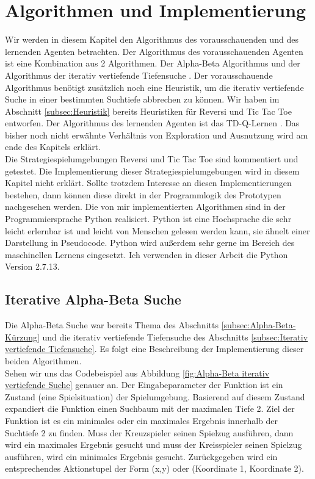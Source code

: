 \chapter{Algorithmen und Implementierung}
\label{cha:Algorithmen und Implementierung}

Wir werden in diesem Kapitel den Algorithmus des vorausschauenden und des lernenden Agenten betrachten. Der Algorithmus des vorausschauenden Agenten ist eine Kombination aus 2 Algorithmen. Der Alpha-Beta Algorithmus \cite[212 \psqq]{Russell} und der Algorithmus der iterativ vertiefende Tiefensuche \cite[124 \psqq]{Russell}. Der vorausschauende Algorithmus benötigt zusätzlich noch eine Heuristik, um die iterativ vertiefende Suche in einer bestimmten Suchtiefe abbrechen zu können. Wir haben im Abschnitt \ref{subsec:Heuristik} bereits Heuristiken für Reversi und Tic Tac Toe entworfen. Der Algorithmus des lernenden Agenten ist das TD-Q-Lernen \cite[973 \psqq]{Russell}. Das bisher noch nicht erwähnte Verhältnis von Exploration und Ausnutzung wird am ende des Kapitels erklärt.\\

Die Strategiespielumgebungen Reversi und Tic Tac Toe sind kommentiert und getestet. Die Implementierung dieser Strategiespielumgebungen wird in diesem Kapitel nicht erklärt. Sollte trotzdem Interesse an diesen Implementierungen bestehen, dann können diese direkt in der Programmlogik des Prototypen nachgesehen werden. Die von mir implementierten Algorithmen sind in der Programmiersprache Python realisiert. Python ist eine Hochsprache die sehr leicht erlernbar ist und leicht von Menschen gelesen werden kann, sie ähnelt einer Darstellung in Pseudocode. Python wird außerdem sehr gerne im Bereich des maschinellen Lernens eingesetzt. Ich verwenden in dieser Arbeit die Python Version 2.7.13. \\

\section{Iterative Alpha-Beta Suche}
Die Alpha-Beta Suche war bereits Thema des Abschnitts \ref{subsec:Alpha-Beta-Kürzung} und die iterativ vertiefende Tiefensuche des Abschnitts \ref{subsec:Iterativ vertiefende Tiefensuche}. Es folgt eine Beschreibung der Implementierung dieser beiden Algorithmen.\\

Sehen wir uns das Codebeispiel aus Abbildung \ref{fig:Alpha-Beta iterativ vertiefende Suche} genauer an. Der Eingabeparameter der Funktion ist ein Zustand (eine Spielsituation) der Spielumgebung. Basierend auf diesem Zustand expandiert die Funktion einen Suchbaum mit der maximalen Tiefe 2. Ziel der Funktion ist es ein minimales oder ein maximales Ergebnis innerhalb der Suchtiefe 2 zu finden. Muss der Kreuzspieler seinen Spielzug ausführen, dann wird ein maximales Ergebnis gesucht und muss der Kreisspieler seinen Spielzug ausführen, wird ein minimales Ergebnis gesucht. Zurückgegeben wird ein entsprechendes Aktionstupel der Form (x,y) oder (Koordinate 1, Koordinate 2). \\

